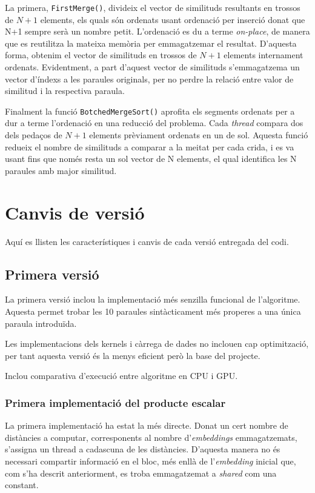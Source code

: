 \documentclass[catalan,10pt,a4paper]{article}
\begin{document}
La primera, \verb|FirstMerge()|, divideix el vector de similituds resultants en trossos de $N+1$ elements, els quals són ordenats usant ordenació per inserció donat que N+1 sempre serà un nombre petit. L'ordenació es du a terme \textit{on-place}, de manera que es reutilitza la mateixa memòria per emmagatzemar el resultat.\newline
D'aquesta forma, obtenim el vector de similituds en trossos de $N+1$ elements internament ordenats. Evidentment, a part d'aquest vector de similituds s'emmagatzema un vector d'índexs a les paraules originals, per no perdre la relació entre valor de similitud i la respectiva paraula.

Finalment la funció \verb|BotchedMergeSort()| aprofita els segments ordenats per a dur a terme l'ordenació en una reducció del problema. Cada \textit{thread} compara dos dels pedaços de $N+1$ elements prèviament ordenats en un de sol.\newline
Aquesta funció redueix el nombre de similituds a comparar a la meitat per cada crida, i es va usant fins que només resta un sol vector de N elements, el qual identifica les N paraules amb major similitud.

\section*{Canvis de versió}
Aquí es llisten les característiques i canvis de cada versió entregada del codi.
\subsection*{Primera versió}
La primera versió inclou la implementació més senzilla funcional de l'algoritme. Aquesta permet trobar les 10 paraules sintàcticament més properes a una única paraula introduïda.

Les implementacions dels kernels i càrrega de dades no inclouen cap optimització, per tant aquesta versió és la menys eficient però la base del projecte.

Inclou comparativa d'execució entre algoritme en CPU i GPU.

\subsubsection*{Primera implementació del producte escalar}
La primera implementació ha estat la més directe. Donat un cert nombre de distàncies a computar, corresponents al nombre d'\textit{embeddings} emmagatzemats, s'assigna un thread a cadascuna de les distàncies. D'aquesta manera no és necessari compartir informació en el bloc, més enllà de l'\textit{embedding} inicial que, com s'ha descrit anteriorment, es troba emmagatzemat a \textit{shared} com una constant.
\end{document}
